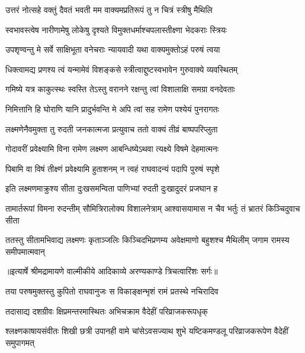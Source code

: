 \twolineshloka
{उत्तरं नोत्सहे वक्तुं दैवतं भवती मम}
{वाक्यमप्रतिरूपं तु न चित्रं स्त्रीषु मैथिलि} %

\twolineshloka
{स्वभावस्त्वेष नारीणामेषु लोकेषु दृश्यते}
{विमुक्तधर्माश्चपलास्तीक्ष्णा भेदकराः स्त्रियः} %

\twolineshloka
{उपशृण्वन्तु मे सर्वे साक्षिभूता वनेचराः}
{न्यायवादी यथा वाक्यमुक्तोऽहं परुषं त्वया} %

\twolineshloka
{धिक्त्वामद्य प्रणश्य त्वं यन्मामेवं विशङ्कसे}
{स्त्रीत्वाद्दुष्टस्वभावेन गुरुवाक्ये व्यवस्थितम्} %

\twolineshloka
{गमिष्ये यत्र काकुत्स्थः स्वस्ति तेऽस्तु वरानने}
{रक्षन्तु त्वां विशालाक्षि समग्रा वनदेवताः} %

\twolineshloka
{निमित्तानि हि घोराणि यानि प्रादुर्भवन्ति मे}
{अपि त्वां सह रामेण पश्येयं पुनरागतः} %

\twolineshloka
{लक्ष्मणेनैवमुक्ता तु रुदती जनकात्मजा}
{प्रत्युवाच ततो वाक्यं तीव्रं बाष्पपरिप्लुता} %

\twolineshloka
{गोदावरीं प्रवेक्ष्यामि विना रामेण लक्ष्मण}
{आबन्धिष्येऽथवा त्यक्ष्ये विषमे देहमात्मनः} %

\twolineshloka
{पिबामि वा विषं तीक्ष्णं प्रवेक्ष्यामि हुताशनम्}
{न त्वहं राघवादन्यं पदापि पुरुषं स्पृशे} %

\twolineshloka
{इति लक्ष्मणमाक्रुश्य सीता दुःखसमन्विता}
{पाणिभ्यां रुदती दुःखादुदरं प्रजघान ह} %

\fourlineindentedshloka
{तामार्तरूपां विमना रुदन्तीम्}
{सौमित्रिरालोक्य विशालनेत्राम्}
{आश्वासयामास न चैव भर्तुः}
{तं भ्रातरं किञ्चिदुवाच सीता} %

\fourlineindentedshloka
{ततस्तु सीतामभिवाद्य लक्ष्मणः}
{कृताञ्जलिः किञ्चिदभिप्रणम्य}
{अवेक्षमाणो बहुशश्च मैथिलीम्}
{जगाम रामस्य समीपमात्मवान्} %


{॥इत्यार्षे श्रीमद्रामायणे वाल्मीकीये आदिकाव्ये अरण्यकाण्डे त्रिचत्वारिंशः सर्गः॥}


\twolineshloka
{तया परुषमुक्तस्तु कुपितो राघवानुजः}
{स विकाङ्क्षन्भृशं रामं प्रतस्थे नचिरादिव} %

\twolineshloka
{तदासाद्य दशग्रीवः क्षिप्रमन्तरमास्थितः}
{अभिचक्राम वैदेहीं परिव्राजकरूपधृक्} %

\threelineshloka
{श्लक्ष्णकाषायसंवीतः शिखी छत्री उपानही}
{वामे चांसेऽवसज्याथ शुभे यष्टिकमण्डलू}
{परिव्राजकरूपेण वैदेहीं समुपागमत्} %

